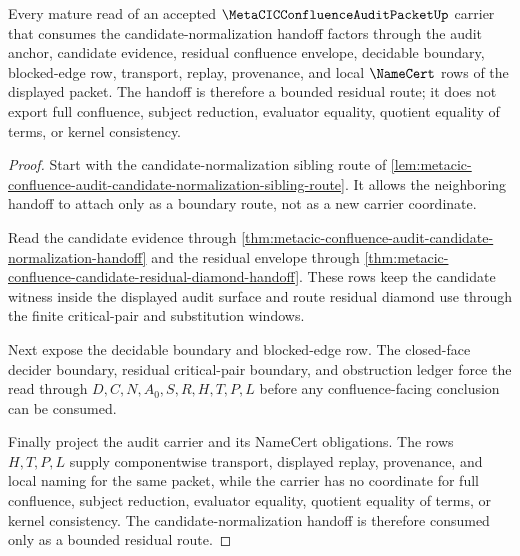 \begin{theorem}
\label{thm:metacic-confluence-auditpacket-mature-crosscheck}
Every mature read of an accepted $\MetaCICConfluenceAuditPacketUp$ carrier that consumes the candidate-normalization handoff factors through the audit anchor, candidate evidence, residual confluence envelope, decidable boundary, blocked-edge row, transport, replay, provenance, and local $\NameCert$ rows of the displayed packet. The handoff is therefore a bounded residual route; it does not export full confluence, subject reduction, evaluator equality, quotient equality of terms, or kernel consistency.
\end{theorem}
\begin{proof}
Start with the candidate-normalization sibling route of \autoref{lem:metacic-confluence-audit-candidate-normalization-sibling-route}. It allows the neighboring handoff to attach only as a boundary route, not as a new carrier coordinate.

Read the candidate evidence through \autoref{thm:metacic-confluence-audit-candidate-normalization-handoff} and the residual envelope through \autoref{thm:metacic-confluence-candidate-residual-diamond-handoff}. These rows keep the candidate witness inside the displayed audit surface and route residual diamond use through the finite critical-pair and substitution windows.

Next expose the decidable boundary and blocked-edge row. The closed-face decider boundary, residual critical-pair boundary, and obstruction ledger force the read through $D,C,N,A_0,S,R,H,T,P,L$ before any confluence-facing conclusion can be consumed.

Finally project the audit carrier and its NameCert obligations. The rows $H,T,P,L$ supply componentwise transport, displayed replay, provenance, and local naming for the same packet, while the carrier has no coordinate for full confluence, subject reduction, evaluator equality, quotient equality of terms, or kernel consistency. The candidate-normalization handoff is therefore consumed only as a bounded residual route.
\end{proof}
